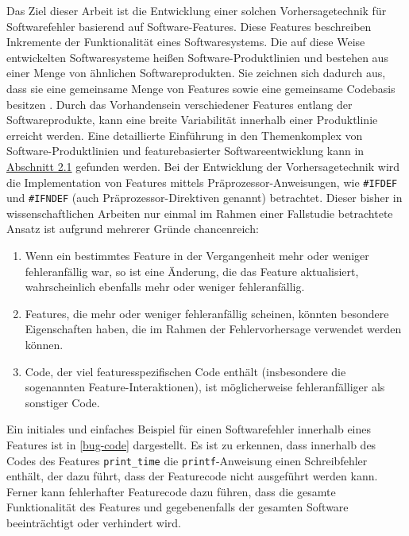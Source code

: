 Das Ziel dieser Arbeit ist die Entwicklung einer solchen Vorhersagetechnik für Softwarefehler basierend auf Software-Features. Diese Features beschreiben Inkremente der Funktionalität eines Softwaresystems. Die auf diese Weise entwickelten Softwaresysteme heißen Software-Produktlinien und bestehen aus einer Menge von ähnlichen Softwareprodukten. Sie zeichnen sich dadurch aus, dass sie eine gemeinsame Menge von Features sowie eine gemeinsame Codebasis besitzen \cite{Thuem2014}. Durch das Vorhandensein verschiedener Features entlang der Softwareprodukte, kann eine breite Variabilität innerhalb einer Produktlinie erreicht werden. Eine detaillierte Einführung in den Themenkomplex von Software-Produktlinien und featurebasierter Softwareentwicklung kann in \hyperref[feat-develop]{Abschnitt 2.1} gefunden werden. Bei der Entwicklung der Vorhersagetechnik wird die Implementation von Features mittels Präprozessor-Anweisungen, wie \texttt{\#IFDEF} und \texttt{\#IFNDEF} (auch Präprozessor-Direktiven genannt) betrachtet. Dieser bisher in wissenschaftlichen Arbeiten nur einmal im Rahmen einer Fallstudie betrachtete Ansatz \cite{Queiroz2016} ist aufgrund mehrerer Gründe chancenreich:

\begin{enumerate}
\setlength{\itemsep}{-2pt}
\item Wenn ein bestimmtes Feature in der Vergangenheit mehr oder weniger fehleranfällig war, so ist eine Änderung, die das Feature aktualisiert, wahrscheinlich ebenfalls mehr oder weniger fehleranfällig. 
\item Features, die mehr oder weniger fehleranfällig scheinen, könnten besondere Eigenschaften haben, die im Rahmen der Fehlervorhersage verwendet werden können.
\item Code, der viel featuresspezifischen Code enthält (insbesondere die sogenannten Feature-Interaktionen), ist möglicherweise fehleranfälliger als sonstiger Code.
\end{enumerate}

Ein initiales und einfaches Beispiel für einen Softwarefehler innerhalb eines Features ist in \autoref{bug-code} dargestellt. Es ist zu erkennen, dass innerhalb des Codes des Features \texttt{print\_time} die \texttt{printf}-Anweisung einen Schreibfehler enthält, der dazu führt, dass der Featurecode nicht ausgeführt werden kann. Ferner kann fehlerhafter Featurecode dazu führen, dass die gesamte Funktionalität des Features und gegebenenfalls der gesamten Software beeinträchtigt oder verhindert wird.

